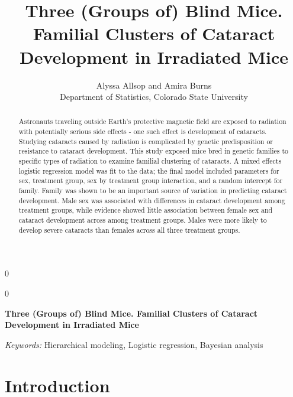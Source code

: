 \documentclass[12pt]{article}
\newcommand{\blind}{0}
\begin{document}
\def\spacingset#1{\renewcommand{\baselinestretch}%
{#1}\small\normalsize} \spacingset{1}



\blind
{
  \title{\bf Three (Groups of) Blind Mice. Familial Clusters of Cataract Development in Irradiated Mice}

  \author{
        Alyssa Allsop and Amira Burns \\
    Department of Statistics, Colorado State University\\
      }
  \maketitle
} \fi

\blind
{
  \bigskip
  \bigskip
  \bigskip
  \begin{center}
    {\LARGE\bf Three (Groups of) Blind Mice. Familial Clusters of Cataract Development in Irradiated Mice}
  \end{center}
  \medskip
} \fi

\bigskip
\begin{abstract}
Astronauts traveling outside Earth's protective magnetic field are exposed to radiation with potentially serious side effects - one such effect is development of cataracts. Studying cataracts caused by radiation is complicated by genetic predisposition or resistance to cataract development. This study exposed mice bred in genetic families to specific types of radiation to examine familial clustering of cataracts. A mixed effects logistic regression model was fit to the data; the final model included parameters for sex, treatment group, sex by treatment group interaction, and a random intercept for family. Family was shown to be an important source of variation in predicting cataract development. Male sex was associated with differences in cataract development among treatment groups, while evidence showed little association between female sex and cataract development across among treatment groups. Males were more likely to develop severe cataracts than females across all three treatment groups.
\end{abstract}

\noindent%
{\it Keywords:} Hierarchical modeling, Logistic regression, Bayesian analysis
\vfill

\newpage
\spacingset{1.45} %

\section{Introduction}
\label{sec:intro}
\end{document}
